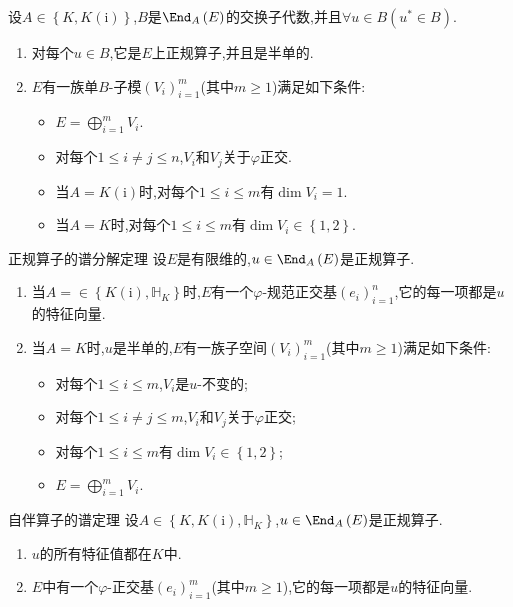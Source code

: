 \begin{corollary}{}{}
	设$A\in\left\{K,K(\mathrm{i})\right\}$,$B$是$\End_{A}\left(E\right)$的交换子代数,并且$\forall u\in B\left(u^{\ast}\in B\right)$.
	\begin{enumerate}
		\item 对每个$u\in B$,它是$E$上正规算子,并且是半单的.
		\item $E$有一族单$B$-子模$\left(V_{i}\right)_{i=1}^{m}$(其中$m\geq 1$)满足如下条件:
		\begin{itemize}
			\item $E=\bigoplus\limits_{i=1}^{m}V_{i}$.
			\item 对每个$1\leq i\neq j\leq n$,$V_{i}$和$V_{j}$关于$\varphi$正交.
			\item 当$A=K(\mathrm{i})$时,对每个$1\leq i\leq m$有$\dim V_{i}=1$.
			\item 当$A=K$时,对每个$1\leq i\leq m$有$\dim V_{i}\in\left\{1,2\right\}$.
		\end{itemize}
	\end{enumerate}
\end{corollary}

\begin{proposition}{正规算子的谱分解定理}{}
	设$E$是有限维的,$u\in\End_{A}\left(E\right)$是正规算子.
	\begin{enumerate}
		\item 当$A=\in\left\{K(\mathrm{i}),\mathbb{H}_{K}\right\}$时,$E$有一个$\varphi$-规范正交基$\left(e_{i}\right)_{i=1}^{n}$,它的每一项都是$u$的特征向量.
		\item 当$A=K$时,$u$是半单的,$E$有一族子空间$\left(V_{i}\right)_{i=1}^{m}$(其中$m\geq 1$)满足如下条件:
		\begin{itemize}
			\item 对每个$1\leq i\leq m$,$V_{i}$是$u$-不变的;
			\item 对每个$1\leq i\neq j\leq m$,$V_{i}$和$V_{j}$关于$\varphi$正交;
			\item 对每个$1\leq i\leq m$有$\dim V_{i}\in\left\{1,2\right\}$;
			\item $E=\bigoplus\limits_{i=1}^{m}V_{i}$.
		\end{itemize}
	\end{enumerate}
\end{proposition}

\begin{proposition}{自伴算子的谱定理}{}
	设$A\in\left\{K,K(\mathrm{i}),\mathbb{H}_{K}\right\}$,$u\in\End_{A}\left(E\right)$是正规算子.
	\begin{enumerate}
		\item $u$的所有特征值都在$K$中.
		\item $E$中有一个$\varphi$-正交基$\left(e_{i}\right)_{i=1}^{m}$(其中$m\geq 1$),它的每一项都是$u$的特征向量.
	\end{enumerate}
\end{proposition}

